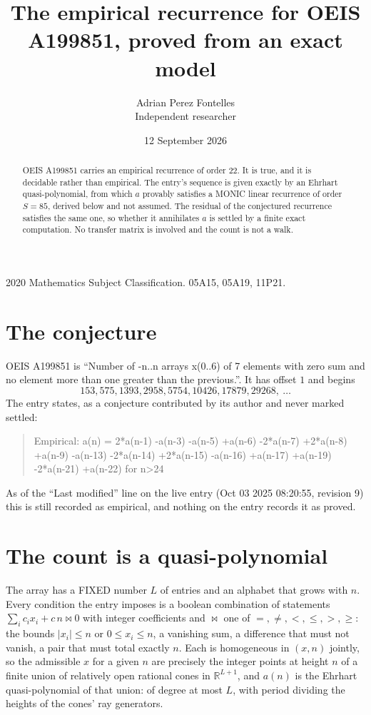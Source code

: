 \documentclass[11pt,a4paper]{article}
\title{The empirical recurrence for OEIS A199851, proved from an exact model}
\author{Adrian Perez Fontelles\\ \small Independent researcher}
\date{12 September 2026}
\theoremstyle{plain}
\theoremstyle{definition}
\begin{document}
\maketitle

\begin{abstract}
OEIS A199851 carries an empirical recurrence of order $22$. It is true, and it is
decidable rather than empirical. The entry's sequence is given exactly by an Ehrhart quasi-polynomial, from
which $a$ provably satisfies a MONIC linear recurrence of order $S=85$, derived below and not
assumed. The residual of the conjectured recurrence satisfies the same one, so whether it
annihilates $a$ is settled by a finite exact computation. No transfer matrix is involved and
the count is not a walk.
\end{abstract}

\noindent\small 2020 Mathematics Subject Classification. 05A15, 05A19, 11P21.\normalsize

\section{The conjecture}

OEIS A199851 is ``Number of -n..n arrays x(0..6) of 7 elements with zero sum and no element more than one greater than the previous.''. It has offset $1$ and begins
\[
153, 575, 1393, 2958, 5754, 10426, 17879, 29268,\ \dots
\]
The entry states, as a conjecture contributed by its author and never marked settled:
\begin{quote}
Empirical: a(n) = 2*a(n-1) -a(n-3) -a(n-5) +a(n-6) -2*a(n-7) +2*a(n-8) +a(n-9) -a(n-13) -2*a(n-14) +2*a(n-15) -a(n-16) +a(n-17) +a(n-19) -2*a(n-21) +a(n-22) for n>24
\end{quote}
As of the ``Last modified'' line on the live entry (Oct 03 2025 08:20:55, revision 9)
this is still recorded as empirical, and nothing on the entry records it as proved.

\section{The count is a quasi-polynomial}

The array has a FIXED number $L$ of entries and an alphabet that grows with $n$. Every
condition the entry imposes is a boolean combination of statements
$\sum_i c_ix_i + c\,n \bowtie 0$ with integer coefficients and $\bowtie$ one of
$=,\ne,<,\le,>,\ge$: the bounds $|x_i|\le n$ or $0\le x_i\le n$, a vanishing sum, a difference
that must not vanish, a pair that must total exactly $n$. Each is homogeneous in $(x,n)$
jointly, so the admissible $x$ for a given $n$ are precisely the integer points at height $n$
of a finite union of relatively open rational cones in $\mathbb{R}^{L+1}$, and $a(n)$ is
the Ehrhart quasi-polynomial of that union: of degree at most $L$, with period dividing the
heights of the cones' ray generators.
\end{document}
